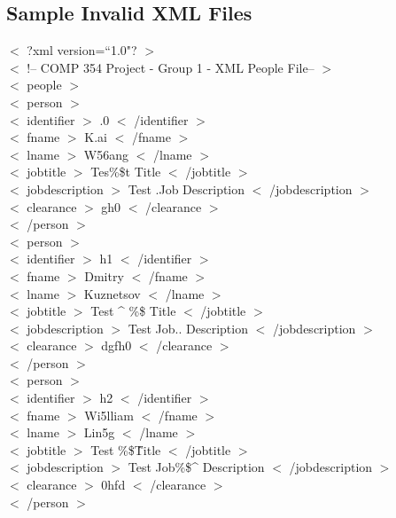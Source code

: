 \documentclass[12pt]{article}
\newcommand{\tab}{\hspace*{2em}}
\begin{document}
\subsection{Sample Invalid XML Files}
{

 $<$ ?xml version=``1.0"? $>$ 
\\ $<$ !-- COMP 354 Project - Group 1 - XML People File-- $>$ 
\\ $<$ people $>$ 
\\ \tab$<$ person $>$ 
\\ \tab\tab $<$ identifier $>$ .0 $<$ /identifier $>$ 
\\ \tab\tab $<$ fname $>$ K.ai $<$ /fname $>$ 
\\ \tab\tab $<$ lname $>$ W56ang $<$ /lname $>$ 
\\ \tab\tab $<$ jobtitle $>$  Tes\%\$t Title $<$ /jobtitle $>$ 
\\ \tab\tab $<$ jobdescription $>$ Test .Job Description $<$ /jobdescription $>$ 
\\ \tab\tab $<$ clearance $>$ gh0 $<$ /clearance $>$ 
\\ \tab$<$ /person $>$ 
\\ \tab$<$ person $>$ 
\\ \tab\tab $<$ identifier $>$ h1 $<$ /identifier $>$ 
\\ \tab\tab $<$ fname $>$ Dmitry $<$ /fname $>$ 
\\ \tab\tab $<$ lname $>$ Kuznetsov $<$ /lname $>$ 
\\ \tab\tab $<$ jobtitle $>$ Test \^{} \%\$ Title $<$ /jobtitle $>$ 
\\ \tab\tab $<$ jobdescription $>$ Test Job.. Description $<$ /jobdescription $>$ 
\\ \tab\tab $<$ clearance $>$ dgfh0 $<$ /clearance $>$ 
\\ \tab$<$ /person $>$ 
\\ \tab$<$ person $>$ 
\\ \tab\tab $<$ identifier $>$ h2 $<$ /identifier $>$ 
\\ \tab\tab $<$ fname $>$ Wi5lliam $<$ /fname $>$ 
\\ \tab\tab $<$ lname $>$ Lin5g $<$ /lname $>$ 
\\ \tab\tab $<$ jobtitle $>$ Test \%\$\^Title $<$ /jobtitle $>$ 
\\ \tab\tab $<$ jobdescription $>$ Test Job\%\$\^{} Description $<$ /jobdescription $>$ 
\\ \tab\tab $<$ clearance $>$ 0hfd $<$ /clearance $>$ 
\\ \tab$<$ /person $>$ 
}
\end{document}
